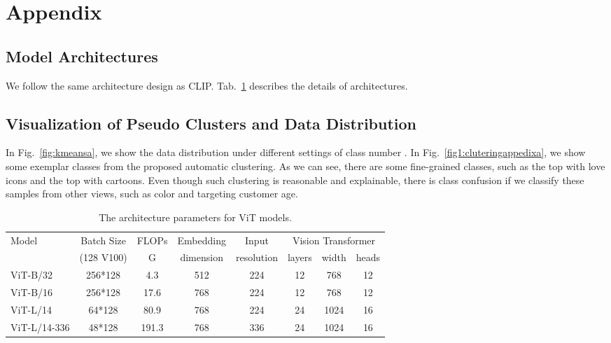 \documentclass{article} \usepackage{iclr2023_conference,times}
\begin{document}



\appendix
\section{Appendix}

\subsection{Model Architectures}
We follow the same architecture design as CLIP. Tab.~\ref{networkstructure} describes the details of architectures.

\subsection{Visualization of Pseudo Clusters and Data Distribution}
In Fig.~\ref{fig:kmeansa}, we show the data distribution under different settings of class number .
In Fig.~\ref{fig1:cluteringappedixa}, we show some exemplar classes from the proposed automatic clustering.
As we can see, there are some fine-grained classes, such as the top with love icons and the top with cartoons.
Even though such clustering is reasonable and explainable, there is class confusion if we classify these samples from other views, such as color and targeting customer age.




\begin{table}
	\caption{The architecture parameters for ViT models.}
	\label{networkstructure}
	\begin{center}
		\begin{tabular}{l|c|c|c|c|ccc}
			\toprule
			Model        & Batch Size & FLOPs & Embedding & Input      & \multicolumn{3}{c}{Vision Transformer}                 \\
			             & (128 V100) & G     & dimension & resolution & layers                                 & width & heads \\
			\midrule
			ViT-B/32     & 256*128    & 4.3   & 512       & 224        & 12                                     & 768   & 12    \\
			ViT-B/16     & 256*128    & 17.6  & 768       & 224        & 12                                     & 768   & 12    \\
			ViT-L/14     & 64*128     & 80.9  & 768       & 224        & 24                                     & 1024  & 16    \\
			ViT-L/14-336 & 48*128     & 191.3 & 768       & 336        & 24                                     & 1024  & 16    \\
			\bottomrule
		\end{tabular}
	\end{center}
\end{table}
\end{document}
